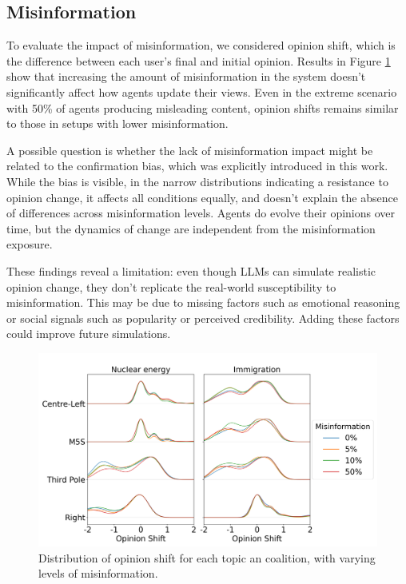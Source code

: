 \subsection{Misinformation}
To evaluate the impact of misinformation, we considered opinion shift, which is the difference between each user’s final and initial opinion.
Results in Figure \ref{fig:misinfo_opinion_shift} show that increasing the amount of misinformation in the system doesn’t significantly affect how agents update their views.
Even in the extreme scenario with 50\% of agents producing misleading content, opinion shifts remains similar to those in setups with lower misinformation.

A possible question is whether the lack of misinformation impact might be related to the confirmation bias, which was explicitly introduced in this work.
While the bias is visible, in the narrow distributions indicating a resistance to opinion change, it affects all conditions equally, and doesn't explain the absence of differences across misinformation levels.
Agents do evolve their opinions over time, but the dynamics of change are independent from the misinformation exposure.


These findings reveal a limitation: even though LLMs can simulate realistic opinion change, they don't replicate the real-world susceptibility to misinformation.
This may be due to missing factors such as emotional reasoning or social signals such as popularity or perceived credibility.
Adding these factors could improve future simulations.


\begin{figure}[h]
    \centering
    \includegraphics[width=1\linewidth]{Images/Misinformation/score_llm_RandomRecSys_small.png}
    \caption{Distribution of opinion shift for each topic an coalition, with varying levels of misinformation.}
    \label{fig:misinfo_opinion_shift}
\end{figure}


